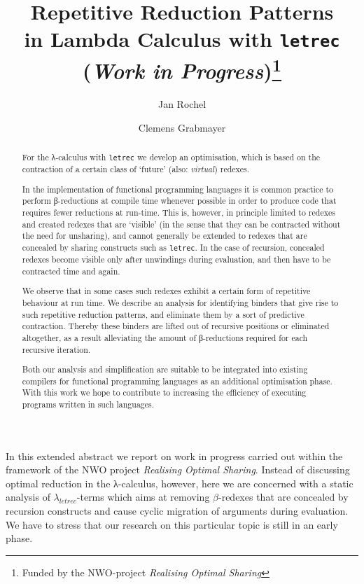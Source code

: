 \documentclass[submission,copyright,creativecommons]{eptcs}
\title{Repetitive Reduction Patterns\\ in Lambda Calculus with {\tt letrec}\\
       ({\it Work in Progress})\thanks{Funded by the NWO-project \emph{Realising Optimal Sharing}}}
\author{
  Jan Rochel
    \institute{Utrecht University\\ Utrecht, The Netherlands}
    \institute{Department of Information and Computing Sciences\\
               Information and Software Systems}
    \email{J.Rochel@cs.uu.nl}
\and
  Clemens Grabmayer
    \institute{Utrecht University\\Utrecht, The Netherlands}
    \institute{Department of Philosophy\\
               Theoretical Philosophy}
    \email{Clemens.Grabmayer@phil.uu.nl}
}
\newcommand{\lambdaletrec}{\ensuremath{\lambda_\textit{letrec}}}
\newcommand{\nbd}{\nobreakdash}
\renewcommand\;{\,}
\begin{document}
\maketitle

\begin{abstract}
For the λ-calculus with \texttt{letrec} we develop an optimisation, which
is based on the contraction of a certain class of `future' (also: \emph{virtual})
redexes.

In the implementation of functional programming languages it is common practice
to perform β\nbd-reductions at compile time whenever possible in order to produce
code that requires fewer reductions at run-time. This is, however, in principle
limited to redexes and created redexes that are `visible' (in the sense that
they can be contracted without the need for unsharing), and cannot generally be
extended to redexes that are concealed by sharing constructs such as
\texttt{letrec}. 
In the case of recursion, concealed redexes become visible only after
unwindings during evaluation, and then have to be contracted time and again.

We observe that in some cases such redexes exhibit a certain form of repetitive
behaviour at run time.
We describe an analysis for identifying binders that give rise to such
repetitive reduction patterns, and eliminate them by a sort of predictive
contraction.
Thereby these binders are lifted out of recursive positions or eliminated altogether,
as a result alleviating the amount of β\nbd-reductions required for each recursive iteration. 

Both our analysis and simplification are suitable to be integrated into existing
compilers for functional programming languages as an additional optimisation phase.
With this work we hope to contribute to increasing the efficiency of executing
programs written in such languages.
\end{abstract}

In this extended abstract we report on work in progress carried out within the
framework of the NWO project \emph{Realising Optimal Sharing}. Instead of
discussing optimal reduction in the λ\nbd-calculus, however, here we are concerned
with a static analysis of $\lambdaletrec$-terms which aims at
removing $\beta$\nbd-redexes that are concealed by recursion constructs and
cause cyclic migration of arguments during evaluation. We have to stress that
our research on this particular topic is still in an early phase. 
\end{document}
